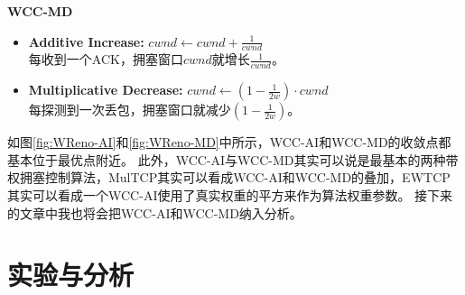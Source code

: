 \documentclass[winfonts]{njuthesis}
\begin{document}
\textbf{\large WCC-MD}
\begin{itemize}
  \item {\bf Additive Increase:} $cwnd \leftarrow cwnd + \frac{1}{cwnd}$ \\
  每收到一个ACK，拥塞窗口$cwnd$就增长$\frac{1}{cwnd}$。
  \item {\bf Multiplicative Decrease:} $cwnd \leftarrow ( 1 - \frac{1}{2w}) \cdot cwnd$ \\
  每探测到一次丢包，拥塞窗口就减少$\left( 1 - \frac{1}{2w} \right)$。
\end{itemize}

如图\ref{fig:WReno-AI}和\ref{fig:WReno-MD}中所示，WCC-AI和WCC-MD的收敛点都基本位于最优点附近。
此外，WCC-AI与WCC-MD其实可以说是最基本的两种带权拥塞控制算法，MulTCP其实可以看成WCC-AI和WCC-MD的叠加，EWTCP其实可以看成一个WCC-AI使用了真实权重的平方来作为算法权重参数。
接下来的文章中我也将会把WCC-AI和WCC-MD纳入分析。

\chapter{实验与分析}\label{chapter:analysis}

\end{document}
